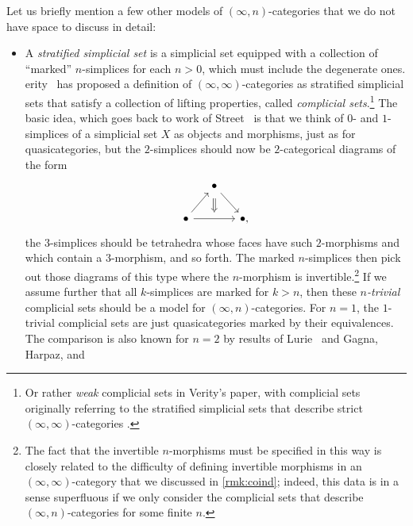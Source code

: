\documentclass[a4paper,11pt]{article}
\begin{document}
\begin{remark}\label{rmk:otherinftyn}
  Let us briefly mention a few other models of $(\infty,n)$-categories
  that we do not have space to discuss in detail:
  \begin{itemize}
  \item A \emph{stratified simplicial set} is a simplicial set
    equipped with a collection of ``marked'' $n$-simplices for each $n >
    0$, which must include the degenerate ones.
    erity~\cite{VerityCompl} has proposed a definition
    of $(\infty,\infty)$-categories as stratified simplicial sets that
    satisfy a collection of lifting properties, called
    \emph{complicial sets}.\footnote{Or rather \emph{weak} complicial
      sets in Verity's paper, with complicial sets originally
      referring to the stratified simplicial sets that describe strict
      $(\infty,\infty)$-categories \cite{VerityStrict}.}
    The basic idea, which goes back to work of
    Street~\cite{StreetOriented} is that we think of $0$- and
    $1$-simplices of a simplicial set $X$ as objects and morphisms,
    just as for quasicategories, but the $2$-simplices should now be
    $2$-categorical diagrams of the form
    \[
      \begin{tikzcd}[column sep=small]
        {} & \bullet \ar[dr] \\
        \bullet \ar[ur] \ar[rr, ""{above,name=A}] & &
        \bullet,
        \ar[from=1-2, to=A, Rightarrow, shorten <=5pt, shorten >= 1pt]
      \end{tikzcd}
    \]
    the $3$-simplices should be tetrahedra whose faces have such
    $2$-morphisms and which contain a $3$-morphism, and so forth. The marked
    $n$-simplices then pick out those diagrams of this type where the
    $n$-morphism is invertible.\footnote{The fact that the invertible
      $n$-morphisms must be specified in this way is closely related
      to the difficulty of defining invertible morphisms in an
      $(\infty,\infty)$-category that we discussed in
      \cref{rmk:coind}; indeed, this data is in a sense superfluous if
      we only consider the complicial sets that describe
      $(\infty,n)$-categories for some finite $n$.}  If we assume
    further that all $k$-simplices are marked for $k > n$, then these
    \emph{$n$-trivial} complicial sets should be a model for
    $(\infty,n)$-categories. For $n = 1$, the $1$-trivial complicial
    sets are just quasicategories marked by their equivalences. The
    comparison is also known for $n = 2$ by results of
    Lurie~\cite{LurieGoodwillie} and Gagna, Harpaz, and

\end{itemize}
\end{remark}
\end{document}
